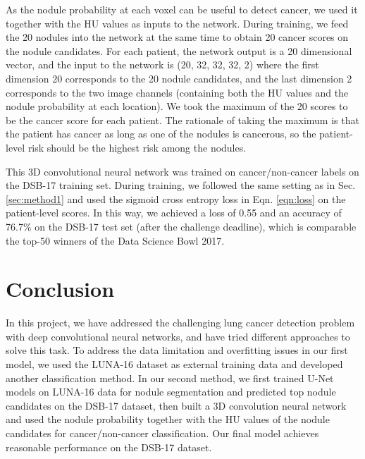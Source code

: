\documentclass{article}
\begin{document}
As the nodule probability at each voxel can be useful to detect cancer, we used it together with the HU values as inputs to the network. During training, we feed the 20 nodules into the network at the same time to obtain 20 cancer scores on the nodule candidates. For each patient, the network output is a 20 dimensional vector, and the input to the network is (20, 32, 32, 32, 2) where the first dimension 20 corresponds to the 20 nodule candidates, and the last dimension 2 corresponds to the two image channels (containing both the HU values and the nodule probability at each location). We took the maximum of the 20 scores to be the cancer score for each patient. The rationale of taking the maximum is that the patient has cancer as long as one of the nodules is cancerous, so the patient-level risk should be the highest risk among the nodules.

This 3D convolutional neural network was trained on cancer/non-cancer labels on the DSB-17 training set. During training, we followed the same setting as in Sec. \ref{sec:method1} and used the sigmoid cross entropy loss in Eqn. \ref{eqn:loss} on the patient-level scores. In this way, we achieved a loss of 0.55 and an accuracy of 76.7\% on the DSB-17 test set (after the challenge deadline), which is comparable the top-50 winners of the Data Science Bowl 2017.

\section{Conclusion}
In this project, we have addressed the challenging lung cancer detection problem with deep convolutional neural networks, and have tried different approaches to solve this task. To address the data limitation and overfitting issues in our first model, we used the LUNA-16 dataset as external training data and developed another classification method. In our second method, we first trained U-Net models on LUNA-16 data for nodule segmentation and predicted top nodule candidates on the DSB-17 dataset, then built a 3D convolution neural network and used the nodule probability together with the HU values of the nodule candidates for cancer/non-cancer classification. Our final model achieves reasonable performance on the DSB-17 dataset.


{\small


}
\end{document}

